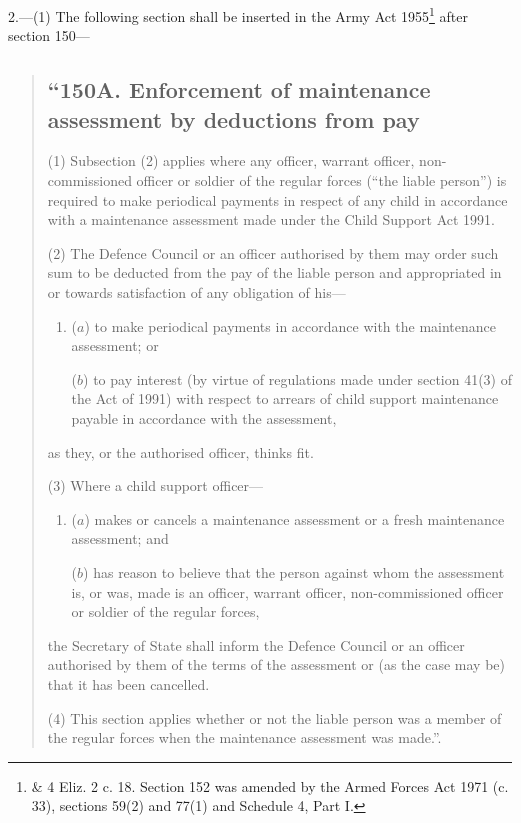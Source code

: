 \documentclass[a4paper]{article}
\begin{document}
2.—(1) The following section shall be inserted in the Army Act 1955\footnote{ \& 4 Eliz. 2 c. 18. Section 152 was amended by the Armed Forces Act 1971 (c. 33), sections 59(2) and 77(1) and Schedule 4, Part I.} after section 150—
\begin{quotation}
\subsection*{“150A. Enforcement of maintenance assessment by deductions from pay}

(1) Subsection (2) applies where any officer, warrant officer, non-commissioned officer or soldier of the regular forces (“the liable person”) is required to make periodical payments in respect of any child in accordance with a maintenance assessment made under the Child Support Act 1991.

(2) The Defence Council or an officer authorised by them may order such sum to be deducted from the pay of the liable person and appropriated in or towards satisfaction of any obligation of his—
\begin{enumerate}\item[]
($a$) to make periodical payments in accordance with the maintenance assessment; or

($b$) to pay interest (by virtue of regulations made under section 41(3) of the Act of 1991) with respect to arrears of child support maintenance payable in accordance with the assessment,
\end{enumerate}
as they, or the authorised officer, thinks fit.

(3) Where a child support officer—
\begin{enumerate}\item[]
($a$) makes or cancels a maintenance assessment or a fresh maintenance assessment; and

($b$) has reason to believe that the person against whom the assessment is, or was, made is an officer, warrant officer, non-commissioned officer or soldier of the regular forces,
\end{enumerate}
the Secretary of State shall inform the Defence Council or an officer authorised by them of the terms of the assessment or (as the case may be) that it has been cancelled.

(4) This section applies whether or not the liable person was a member of the regular forces when the maintenance assessment was made.”.
\end{quotation}
\end{document}
